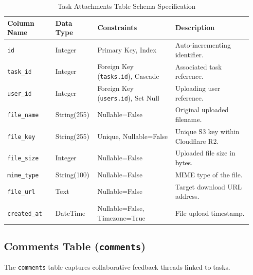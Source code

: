 \begin{table}[h!]
\centering
\small
\renewcommand{\arraystretch}{1.4}
\begin{tabularx}{\textwidth}{l l l X}
    \toprule[1.5pt]
    \rowcolor{primary!5}
    \textbf{\color{primary}Column Name} & \textbf{\color{primary}Data Type} & \textbf{\color{primary}Constraints} & \textbf{\color{primary}Description} \\
    \midrule
    \texttt{id} & Integer & Primary Key, Index & Auto-incrementing identifier. \\
    \texttt{task\_id} & Integer & Foreign Key (\texttt{tasks.id}), Cascade & Associated task reference. \\
    \texttt{user\_id} & Integer & Foreign Key (\texttt{users.id}), Set Null & Uploading user reference. \\
    \texttt{file\_name} & String(255) & Nullable=False & Original uploaded filename. \\
    \texttt{file\_key} & String(255) & Unique, Nullable=False & Unique S3 key within Cloudflare R2. \\
    \texttt{file\_size} & Integer & Nullable=False & Uploaded file size in bytes. \\
    \texttt{mime\_type} & String(100) & Nullable=False & MIME type of the file. \\
    \texttt{file\_url} & Text & Nullable=False & Target download URL address. \\
    \texttt{created\_at} & DateTime & Nullable=False, Timezone=True & File upload timestamp. \\
    \bottomrule[1.5pt]
\end{tabularx}
\caption{Task Attachments Table Schema Specification}
\label{tab:task_attachments_table}
\end{table}

\subsection{Comments Table (\texttt{comments})}
The \texttt{comments} table captures collaborative feedback threads linked to tasks.

